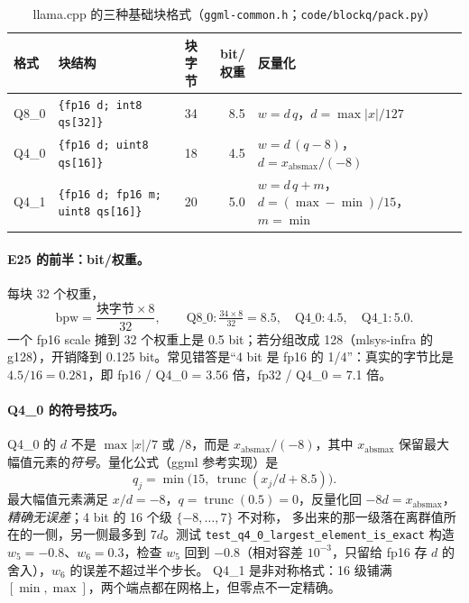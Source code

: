 \documentclass[11pt,a4paper]{ctexart}
\begin{document}
\begin{table}[H]
\centering\small
\caption{llama.cpp 的三种基础块格式（\texttt{ggml-common.h}；\texttt{code/blockq/pack.py}）}\label{tab:formats}
\begin{tabularx}{\linewidth}{l>{\raggedright\arraybackslash}p{4.3cm}rr>{\raggedright\arraybackslash}X}
\toprule
格式 & 块结构 & 块字节 & bit/权重 & 反量化 \\
\midrule
Q8\_0 & \texttt{\{fp16 d; int8 qs[32]\}} & 34 & 8.5 & $w = d\,q$，$d = \max|x| / 127$ \\
Q4\_0 & \texttt{\{fp16 d; uint8 qs[16]\}} & 18 & 4.5 & $w = d\,(q - 8)$，$d = x_{\text{absmax}} / (-8)$ \\
Q4\_1 & \texttt{\{fp16 d; fp16 m;} \texttt{uint8 qs[16]\}} & 20 & 5.0 & $w = d\,q + m$，$d = (\max - \min)/15$，$m = \min$ \\
\bottomrule
\end{tabularx}
\end{table}

\paragraph{E25 的前半：bit/权重。}每块 32 个权重，
\begin{equation}
\text{bpw} = \frac{\text{块字节} \times 8}{32}, \qquad \text{Q8\_0}: \tfrac{34 \times 8}{32} = 8.5,\quad \text{Q4\_0}: 4.5,\quad \text{Q4\_1}: 5.0 .
\label{eq:bpw}
\end{equation}
一个 fp16 scale 摊到 32 个权重上是 0.5 bit；若分组改成 128（mlsys-infra 的 g128），开销降到 0.125 bit。常见错答是“4 bit 是 fp16 的 1/4”：真实的字节比是 $4.5/16 = 0.281$，即 fp16 / Q4\_0 = 3.56 倍，fp32 / Q4\_0 = 7.1 倍。

\paragraph{Q4\_0 的符号技巧。}Q4\_0 的 $d$ 不是 $\max|x|/7$ 或 $/8$，而是 $x_{\text{absmax}}/(-8)$，其中 $x_{\text{absmax}}$ 保留最大幅值元素的\emph{符号}。量化公式（ggml 参考实现）是
\begin{equation}
q_j = \min\bigl(15,\ \operatorname{trunc}(x_j / d + 8.5)\bigr).
\label{eq:q40}
\end{equation}
最大幅值元素满足 $x/d = -8$，$q = \operatorname{trunc}(0.5) = 0$，反量化回 $-8d = x_{\text{absmax}}$，\emph{精确无误差}；4 bit 的 16 个级 $\{-8,\dots,7\}$ 不对称，
多出来的那一级落在离群值所在的一侧，另一侧最多到 $7d$。测试 \texttt{test\_q4\_0\_largest\_element\_is\_exact} 构造 $w_5 = -0.8$、$w_6 = 0.3$，检查 $w_5$ 回到 $-0.8$（相对容差 $10^{-3}$，只留给 fp16 存 $d$ 的舍入），$w_6$ 的误差不超过半个步长。
Q4\_1 是非对称格式：16 级铺满 $[\min, \max]$，两个端点都在网格上，但零点不一定精确。
\end{document}
